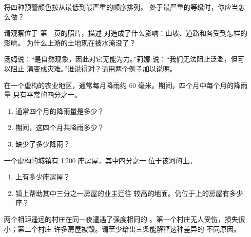 \begin{exercise}[$\star$]\label{exo:g5:natural-hazards:6}
将四种预警颜色按从最低到最严重的顺序排列。
处于最严重的等级时，你应当怎么做？
\end{exercise}

\begin{exercise}[$\star\star$]\label{exo:g5:natural-hazards:7}
请观察位于
第~\pageref{fig:g5:natural-hazards:landslide}~页的照片，描述
对造成了什么影响：山坡、道路和各受到怎样的影响。
为什么上游的土地现在被水淹没了？
\end{exercise}

\begin{exercise}[$\star\star$]\label{exo:g5:natural-hazards:8}
汤姆说：“是自然现象，因此对它无能为力。”莉娜
说：“我们无法阻止泛滥，但可以阻止
演变成灾难。”谁说得对？请用两个例子加以说明。
\end{exercise}

\begin{exercise}[$\star\star$]\label{exo:g5:natural-hazards:9}
在一个虚构的农业地区，通常每月降雨约
60 毫米。期间，四个月中每个月的降雨量
只有平常的四分之一。
\begin{enumerate}
  \item[(a)] 通常四个月的降雨量是多少？
  \item[(b)] 期间，这四个月共降雨多少？
  \item[(c)] 缺少了多少降雨？
\end{enumerate}
\end{exercise}

\begin{exercise}[$\star\star$]\label{exo:g5:natural-hazards:10}
一个虚构的城镇有 1\,200 座房屋，其中四分之一
位于该河的上。
\begin{enumerate}
  \item[(a)] 上有多少座房屋？
  \item[(b)] 镇上帮助其中三分之一房屋的业主迁往
        较高的地面。仍位于上的房屋有多少座？
\end{enumerate}
\end{exercise}

\begin{exercise}[$\star\star\star$]\label{exo:g5:natural-hazards:11}
两个相距遥远的村庄在同一夜遭遇了强度相同的
。第一个村庄无人受伤，损失很小；第二个村庄
许多房屋被毁。请至少给出三条能解释这种差异的
不同原因。
\end{exercise}
